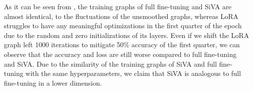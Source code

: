 As it can be seen from , the training graphs of full fine-tuning and SiVA are almost identical, to the fluctuations of the unsmoothed graphs, whereas LoRA struggles to have any meaningful optimizations in the first quarter of the epoch due to the random and zero initializations of its layers. Even if we shift the LoRA graph left 1000 iterations to mitigate 50\% accuracy of the first quarter, we can observe that the accuracy and loss are still worse compared to full fine-tuning and SiVA. Due to the similarity of the training graphs of SiVA and full fine-tuning with the same hyperparameters, we claim that SiVA is analogous to full fine-tuning in a lower dimension.
